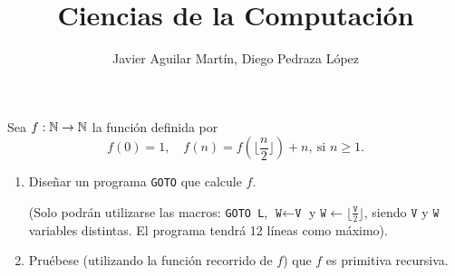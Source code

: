\documentclass[twoside]{article}
\begin{document}
\title{Ciencias de la Computación}

\author{Javier Aguilar Martín, Diego Pedraza López}
\maketitle

\begin{ejercicio}{1}
Sea $f : \mathbb{N} \to \mathbb{N}$ la función definida por
$$f(0) = 1,\quad f(n) = f(\lfloor\frac{n}{2}\rfloor) + n,\ \text{si }n \geq 1.$$
\begin{enumerate}
\item Diseñar un programa \texttt{GOTO} que calcule $f$.

(Solo podrán utilizarse las macros: \texttt{GOTO L}, $\texttt{W}\leftarrow \texttt{V}$ y $\texttt{W}\leftarrow   \lfloor\frac{\texttt{V}}{2}\rfloor$, siendo $\texttt{V}$ y $\texttt{W}$ variables
distintas. El programa tendrá 12 líneas como máximo).
\item Pruébese (utilizando la función recorrido de $f$) que $f$ es primitiva recursiva.
\end{enumerate}
\end{ejercicio}
\end{document}
